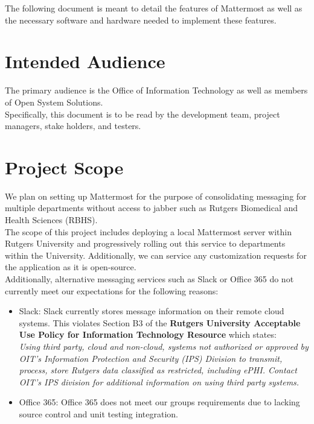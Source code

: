 \documentclass{scrreprt}
\begin{document}
The following document is meant to detail the features of Mattermost as well as
the necessary software and hardware needed to implement these features.

\section{Intended Audience}
The primary audience is the Office of Information Technology as well as members
of Open System Solutions.\\

Specifically, this document is to be read by the development team,
project managers, stake holders, and testers.

\section{Project Scope}
We plan on setting up Mattermost for the purpose of consolidating messaging for
multiple departments without access to jabber such as Rutgers Biomedical
and Health Sciences (RBHS).\\

The scope of this project includes deploying a local Mattermost server within
Rutgers University and progressively rolling out this service to departments
within the University.  Additionally, we can service any customization requests
for the application as it is open-source.\\

Additionally, alternative messaging services such as Slack or Office 365 do
not currently meet our expectations for the following reasons:
\begin{itemize}
  \item Slack: Slack currently stores message information on their remote
    cloud systems.  This violates Section B3 of the \textbf{Rutgers University Acceptable
    Use Policy for Information Technology Resource} which states:\\
    \noindent
    \textit{Using third party, cloud and non-cloud, systems not authorized or 
      approved by OIT’s Information Protection and Security (IPS) Division to 
      transmit, process, store Rutgers data classified as restricted, including 
      ePHI. Contact OIT’s IPS division for additional information on using 
      third party systems.}
  \item Office 365: Office 365 does not meet our groups requirements due to
    lacking source control and unit testing integration.
\end{itemize}
\end{document}
